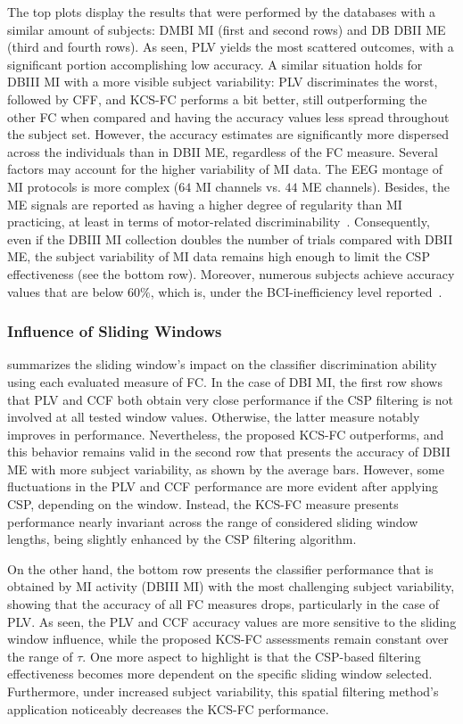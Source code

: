 {The top plots display the results that were performed by the databases with a similar amount of subjects: DMBI MI (first and second rows) and DB DBII ME (third and fourth rows). As seen, PLV yields the most scattered outcomes, with a significant portion accomplishing low accuracy.} {A similar situation holds for DBIII MI with a more visible subject variability: PLV discriminates the worst, followed by CFF, and KCS-FC performs a bit better, still outperforming the other FC when compared and having the accuracy values less spread throughout the subject set}. However, the accuracy estimates are significantly more dispersed across the individuals than in DBII ME, regardless of the FC measure. Several factors may account for the higher variability of MI data. The EEG montage of MI protocols is more complex ($64$ MI channels vs. $44$ ME channels). Besides, the ME signals are reported as having a higher degree of regularity than MI practicing, at least in terms of motor-related discriminability~\cite{shamsi2020early}. Consequently, even if the DBIII MI collection doubles the number of trials compared with DBII ME, the subject variability of MI data remains high enough to limit the CSP effectiveness (see the bottom row). Moreover, numerous subjects achieve accuracy values that are below $60\%$, which is, under the BCI-inefficiency level reported~\cite{Sanelli2019}. 

\subsubsection{Influence of Sliding Windows}

 summarizes the sliding window's impact on the classifier discrimination ability using each evaluated measure of FC. In the case of DBI MI, the first row shows that PLV and CCF both obtain very close performance if the CSP filtering is not involved at all tested window values. Otherwise, the latter measure notably improves in performance. Nevertheless, the proposed KCS-FC outperforms, and this behavior remains valid in the second row that presents the accuracy of DBII ME with more subject variability, as shown by the average bars. However, some fluctuations in the PLV and CCF performance are more evident after applying CSP, depending on the window. Instead, the KCS-FC measure presents performance nearly invariant across the range of considered sliding window lengths, being slightly enhanced by the CSP filtering algorithm.

On the other hand, the bottom row presents the classifier performance that is obtained by MI activity (DBIII MI) with the most challenging subject variability, showing that the accuracy of all FC measures drops, particularly in the case of PLV. As seen, the PLV and CCF accuracy values are more sensitive to the sliding window influence, while the proposed KCS-FC assessments remain constant over the range of $\tau$. One more aspect to highlight is that the CSP-based filtering effectiveness becomes more dependent on the specific sliding window selected. Furthermore, under increased subject variability, this spatial filtering method's application noticeably decreases the KCS-FC performance.

